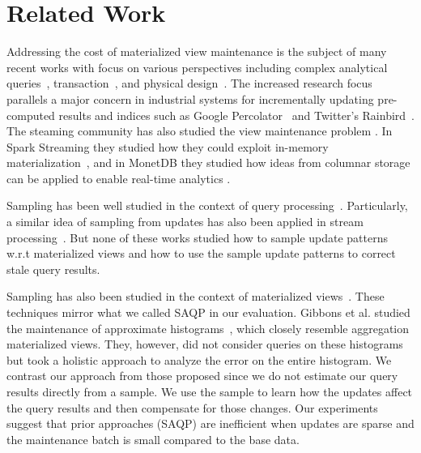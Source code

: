 \section{Related Work}

Addressing the cost of materialized view maintenance is the subject of many recent works with
focus on various perspectives including complex analytical queries~\cite{nikolic2014linview}, transaction~\cite{bailis2014scalable}, and physical design~\cite{lefevre2014opportunistic}.
The increased research focus parallels a major concern in industrial systems for incrementally updating pre-computed results and indices such as Google Percolator~\cite{percolator} and Twitter's Rainbird~\cite{rainbird}.
The steaming community has also studied the view maintenance problem \cite{abadi2003aurora,golab2011consistency, golab2012scalable, he2010comet, ghanem2010supporting}. In Spark Streaming they studied how they could exploit in-memory materialization~\cite{zaharia2012discretized}, and in MonetDB they studied how ideas from columnar storage can be applied to enable real-time analytics \cite{liarou2012monetdb}.


Sampling has been well studied in the context of query processing~\cite{agarwal2013blinkdb, olken1993random, garofalakis2001approximate}. Particularly, a similar idea of sampling from updates has also been applied in stream processing~\cite{tatbul2003load, Garofalakis, rabkin2014aggregation}. But none of these works studied how to sample update patterns w.r.t materialized views and how to use the sample update patterns to correct stale query results.

Sampling has also been studied in the context of materialized views~\cite{joshi2008materialized,DBLP:conf/icde/OlkenR92}.
These techniques mirror what we called SAQP in our evaluation.
Gibbons et al. studied the maintenance of approximate histograms~\cite{gibbons1997fast}, which closely resemble aggregation materialized views.
They, however, did not consider queries on these histograms but took a holistic approach to analyze the error on the entire histogram.
We contrast our approach from those proposed since we do not estimate our query results directly from a sample.
We use the sample to learn how the updates affect the query results and then compensate for those changes.
Our experiments suggest that prior approaches (SAQP) are inefficient when updates are sparse and the maintenance batch is small compared to the base data.

